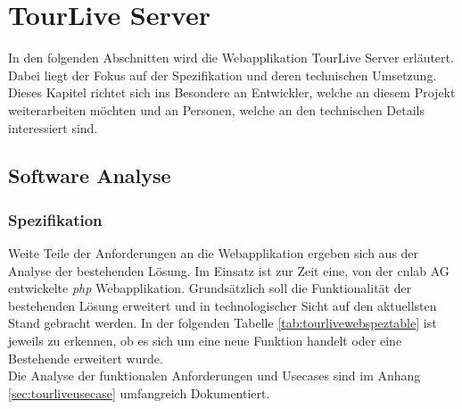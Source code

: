 \chapter{TourLive Server}
\label{sec:tourliveserver}
In den folgenden Abschnitten wird die Webapplikation TourLive Server erläutert. Dabei liegt der Fokus auf der Spezifikation und deren technischen Umsetzung. Dieses Kapitel richtet sich ins Besondere an Entwickler, welche an diesem Projekt weiterarbeiten möchten und an Personen, welche an den technischen Details interessiert sind.

\section{Software Analyse}
\subsection{Spezifikation}
Weite Teile der Anforderungen an die Webapplikation ergeben sich aus der Analyse der bestehenden Lösung. Im Einsatz ist zur Zeit eine, von der cnlab AG entwickelte \textit{\gls{php}} Webapplikation. Grundsätzlich soll die Funktionalität der bestehenden Lösung erweitert und in technologischer Sicht auf den aktuellsten Stand gebracht werden. In der folgenden Tabelle \ref{tab:tourlivewebspeztable} ist jeweils zu erkennen, ob es sich um eine neue Funktion handelt oder eine Bestehende erweitert wurde.
\\
Die Analyse der funktionalen Anforderungen und Usecases sind im Anhang \ref{sec:tourliveusecase} umfangreich Dokumentiert.

